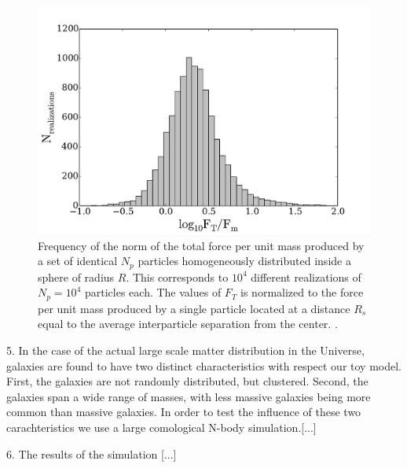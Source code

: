\documentclass{article}
\begin{document}
\begin{figure}
\begin{center}
\includegraphics[width=0.8\linewidth,angle=0]{spheres_bulk.pdf}
\caption{\label{fig:sphere_bulk} Frequency of the norm of the total
  force per unit mass produced by a set of identical $N_p$ particles
  homogeneously distributed inside a sphere of radius $R$. This
  corresponds to $10^4$ different realizations of $N_p=10^4$ particles
 each. The values of $F_T$ is normalized to the force per unit mass
 produced by a single particle located at a distance $R_s$ equal to
 the average interparticle separation from the center. \label{fig:sphere_surface}.} 
\end{center}
\end{figure}


5. In the case of the actual large scale matter distribution in the
Universe, galaxies are found to have two distinct characteristics with
respect our toy model. First, the galaxies are not randomly
distributed, but clustered. Second, the galaxies span a wide range of
masses, with less massive galaxies being more common than massive
galaxies. In order to test the influence of these two carachteristics
we use a large comological N-body simulation.[...]

6. The results of the simulation [...] 
\end{document}
